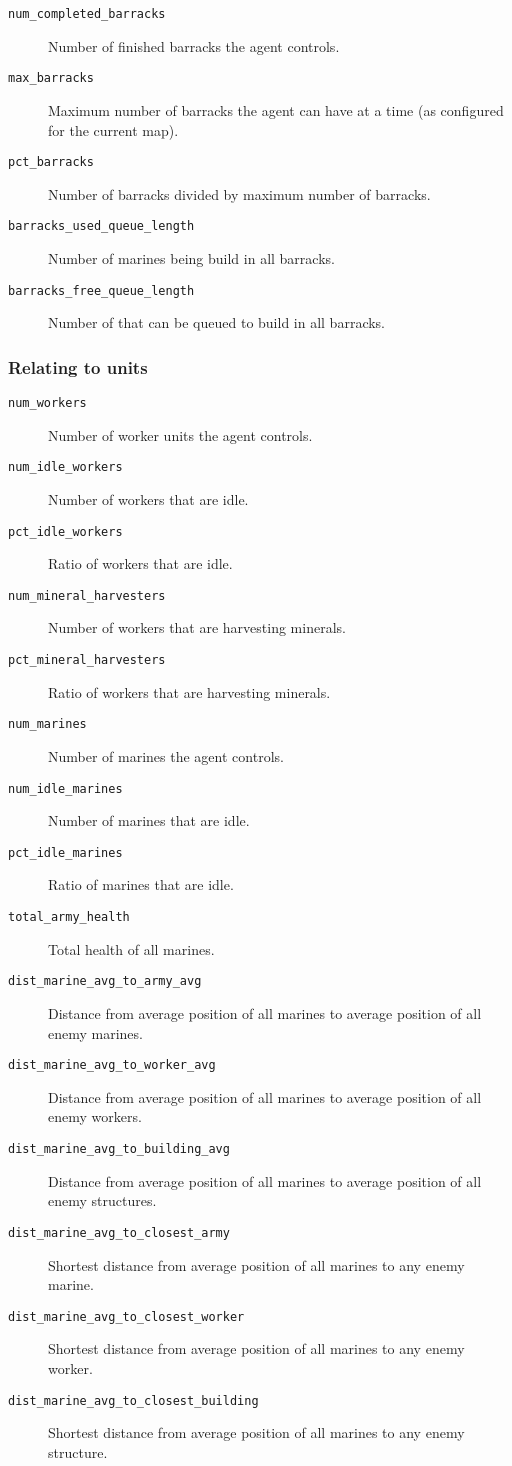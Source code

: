 \begin{description}
    \item[\texttt{num\_completed\_barracks}] Number of finished barracks the agent controls.
    \item[\texttt{max\_barracks}] Maximum number of barracks the agent can have at a time (as configured for the current map).
    \item[\texttt{pct\_barracks}] Number of barracks divided by maximum number of barracks.
    \item[\texttt{barracks\_used\_queue\_length}] Number of marines being build in all barracks.
    \item[\texttt{barracks\_free\_queue\_length}] Number of that can be queued to build in all barracks.
\end{description}

\subsubsection*{Relating to units}
\begin{description}
    \item[\texttt{num\_workers}] Number of worker units the agent controls.
    \item[\texttt{num\_idle\_workers}] Number of workers that are idle.
    \item[\texttt{pct\_idle\_workers}] Ratio of workers that are idle.
    \item[\texttt{num\_mineral\_harvesters}] Number of workers that are harvesting minerals.
    \item[\texttt{pct\_mineral\_harvesters}] Ratio of workers that are harvesting minerals.
    \item[\texttt{num\_marines}] Number of marines the agent controls.
    \item[\texttt{num\_idle\_marines}] Number of marines that are idle.
    \item[\texttt{pct\_idle\_marines}] Ratio of marines that are idle.
    \item[\texttt{total\_army\_health}] Total health of all marines.
    \item[\texttt{dist\_marine\_avg\_to\_army\_avg}] Distance from average position of all marines to average position of all enemy marines.
    \item[\texttt{dist\_marine\_avg\_to\_worker\_avg}] Distance from average position of all marines to average position of all enemy workers.
    \item[\texttt{dist\_marine\_avg\_to\_building\_avg}] Distance from average position of all marines to average position of all enemy structures.
    \item[\texttt{dist\_marine\_avg\_to\_closest\_army}] Shortest distance from average position of all marines to any enemy marine.
    \item[\texttt{dist\_marine\_avg\_to\_closest\_worker}] Shortest distance from average position of all marines to any enemy worker.
    \item[\texttt{dist\_marine\_avg\_to\_closest\_building}] Shortest distance from average position of all marines to any enemy structure.
\end{description}

